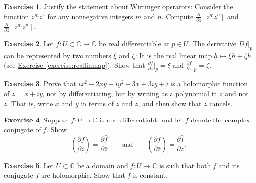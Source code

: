 \documentclass[12pt,openany]{book}
\newcommand{\C}{{\mathbb{C}}}
\theoremstyle{plain}
\theoremstyle{remark}
\theoremstyle{definition}
\newenvironment{exbox}{%
    \def\FrameCommand{\vrule width 1pt \relax\hspace{10pt}}%
    \MakeFramed{\advance\hsize-\width\FrameRestore}%
}{%
    \endMakeFramed
}
\theoremstyle{exercise}
\newtheorem{exercise}{Exercise}[section]
\theoremstyle{example}
\newcommand{\exerciseref}[1]{\hyperref[#1]{Exercise~\ref*{#1}}}
\begin{document}
\begin{exbox}
\begin{exercise}
Justify the statement about Wirtinger operators:  Consider
the function $z^m\bar{z}^n$ for any nonnegative integers $m$ and $n$.
Compute
$\frac{\partial}{\partial z} \left[ z^m\bar{z}^n \right]$
and
$\frac{\partial}{\partial \bar{z}} \left[ z^m\bar{z}^n \right]$.
\end{exercise}

\begin{exercise}
Let $f \colon U \subset \C \to \C$ be real differentiable at $p \in U$.
The derivative $Df|_{p}$ can be represented by two numbers $\xi$ and
$\zeta$: It is the real linear map $h \mapsto \xi h + \zeta \bar{h}$
(see \exerciseref{exercise:reallinmap}).
Show that $\frac{\partial f}{\partial z} \big|_p = \xi$ and
$\frac{\partial f}{\partial \bar{z}} \big|_p = \zeta$.
\end{exercise}

\begin{exercise}
Prove that $ix^2 - 2xy -iy^2 + 3x + 3iy + i$ is a holomorphic function of
$z = x+iy$, not by
differentiating, but by writing as a polynomial in $z$ and not $\bar{z}$.
That is, write $x$ and $y$ in terms of $z$ and $\bar{z}$, and then show
that $\bar{z}$ cancels.
\end{exercise}

\begin{exercise}%
\label{exercise:wirtingerandbar}
Suppose $f \colon U \to \C$ is real differentiable and let $\bar{f}$
denote the complex conjugate of $f$.  Show
\begin{equation*}
\overline{\left(\frac{\partial f}{\partial z}\right)} = 
\frac{\partial \bar{f}}{\partial \bar{z}}
\qquad \text{and} \qquad
\overline{\left(\frac{\partial f}{\partial \bar{z}}\right)} = 
\frac{\partial \bar{f}}{\partial z} .
\end{equation*}
\end{exercise}

\begin{exercise}
Let $U \subset \C$ be a domain and
$f \colon U \to \C$ is such that both $f$ and its conjugate
$\bar{f}$ are holomorphic.  Show that $f$ is constant.
\end{exercise}


\end{exbox}
\end{document}
